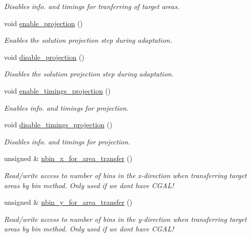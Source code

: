 \begin{DoxyCompactItemize}
\begin{DoxyCompactList}\small\item\em Disables info. and timings for tranferring of target areas. \end{DoxyCompactList}\item 
void \hyperlink{classoomph_1_1RefineableTriangleMesh_a9cbf49d194c39396c7a6765b1c4520fc}{enable\+\_\+projection} ()
\begin{DoxyCompactList}\small\item\em Enables the solution projection step during adaptation. \end{DoxyCompactList}\item 
void \hyperlink{classoomph_1_1RefineableTriangleMesh_a6498186dd8e741789fd34f615b785c84}{disable\+\_\+projection} ()
\begin{DoxyCompactList}\small\item\em Disables the solution projection step during adaptation. \end{DoxyCompactList}\item 
void \hyperlink{classoomph_1_1RefineableTriangleMesh_a3228cb1170b25ce7f24fb520b1df184d}{enable\+\_\+timings\+\_\+projection} ()
\begin{DoxyCompactList}\small\item\em Enables info. and timings for projection. \end{DoxyCompactList}\item 
void \hyperlink{classoomph_1_1RefineableTriangleMesh_a44307109bc432cee8c16bb9d1c921d9e}{disable\+\_\+timings\+\_\+projection} ()
\begin{DoxyCompactList}\small\item\em Disables info. and timings for projection. \end{DoxyCompactList}\item 
unsigned \& \hyperlink{classoomph_1_1RefineableTriangleMesh_a6c52f0bc155980b2c36fb867ce9ec2d7}{nbin\+\_\+x\+\_\+for\+\_\+area\+\_\+transfer} ()
\begin{DoxyCompactList}\small\item\em Read/write access to number of bins in the x-\/direction when transferring target areas by bin method. Only used if we don\textquotesingle{}t have C\+G\+A\+L! \end{DoxyCompactList}\item 
unsigned \& \hyperlink{classoomph_1_1RefineableTriangleMesh_a063dc0162d4e352cbbcbbf72b1171f97}{nbin\+\_\+y\+\_\+for\+\_\+area\+\_\+transfer} ()
\begin{DoxyCompactList}\small\item\em Read/write access to number of bins in the y-\/direction when transferring target areas by bin method. Only used if we don\textquotesingle{}t have C\+G\+A\+L! \end{DoxyCompactList}\item 

\end{DoxyCompactItemize}
